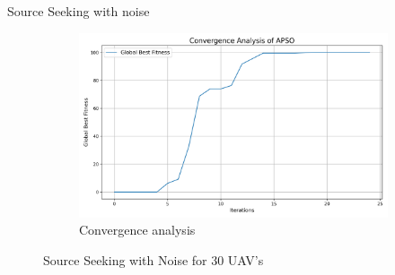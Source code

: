 \documentclass[aspectratio=169]{beamer}
\begin{document}
\begin{frame}{Source Seeking with noise}
\begin{figure}[h]
\begin{subfigure}[b]{0.32\textwidth}
            \includegraphics[width=\textwidth]{../plots/r1_with_noise/convergence_analysis.png}
            \caption{Convergence analysis}
        \end{subfigure}
        \caption{Source Seeking with Noise for 30 UAV's}
    \end{figure}
\end{frame}
\end{document}
